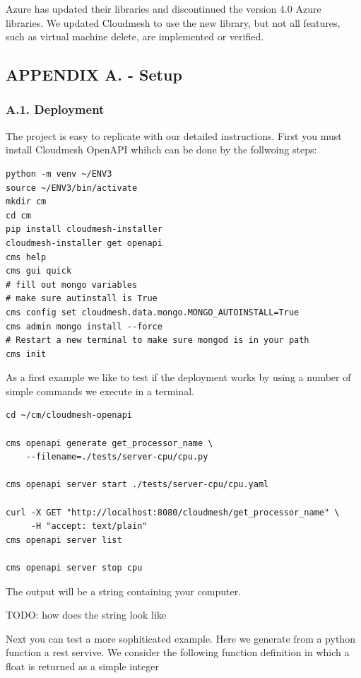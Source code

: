 Azure has updated their libraries and discontinued the version 4.0 Azure
libraries. We updated Cloudmesh to use the new library, but not all
features, such as virtual machine delete, are implemented or verified.

\hypertarget{appendix-a.---setup}{%
\subsection{APPENDIX A. - Setup}\label{appendix-a.---setup}}

\hypertarget{a.1.-deployment}{%
\subsubsection{A.1. Deployment}\label{a.1.-deployment}}

The project is easy to replicate with our detailed instructions. First
you must install Cloudmesh OpenAPI whihch can be done by the follwoing
steps:

\begin{verbatim}
python -m venv ~/ENV3
source ~/ENV3/bin/activate 
mkdir cm
cd cm
pip install cloudmesh-installer
cloudmesh-installer get openapi 
cms help
cms gui quick
# fill out mongo variables
# make sure autinstall is True
cms config set cloudmesh.data.mongo.MONGO_AUTOINSTALL=True
cms admin mongo install --force
# Restart a new terminal to make sure mongod is in your path
cms init
\end{verbatim}

As a first example we like to test if the deployment works by using a
number of simple commands we execute in a terminal.

\begin{verbatim}
cd ~/cm/cloudmesh-openapi

cms openapi generate get_processor_name \
    --filename=./tests/server-cpu/cpu.py

cms openapi server start ./tests/server-cpu/cpu.yaml

curl -X GET "http://localhost:8080/cloudmesh/get_processor_name" \
     -H "accept: text/plain"
cms openapi server list

cms openapi server stop cpu
\end{verbatim}

The output will be a string containing your computer.

TODO: how does the string look like

Next you can test a more sophiticated example. Here we generate from a
python function a rest servive. We consider the following function
definition in which a float is returned as a simple integer

